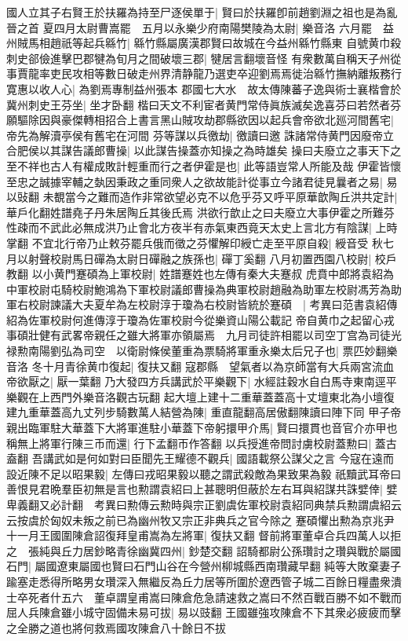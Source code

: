 國人立其子右賢王於扶羅為持至尸逐侯單于|{
	賢曰於扶羅卽前趙劉淵之祖也是為亂晉之首}
夏四月太尉曹嵩罷　五月以永樂少府南陽樊陵為太尉|{
	樂音洛}
六月罷　益州賊馬相趙祇等起兵緜竹|{
	緜竹縣屬廣漢郡賢曰故城在今益州緜竹縣東}
自號黄巾殺刺史郤儉進擊巴郡犍為旬月之間破壞三郡|{
	犍居言翻壞音怪}
有衆數萬自稱天子州從事賈龍率吏民攻相等數日破走州界清静龍乃選吏卒迎劉焉焉徙治緜竹撫納離叛務行寛惠以收人心|{
	為劉焉專制益州張本}
郡國七大水　故太傳陳蕃子逸與術士襄楷會於冀州刺史王芬坐|{
	坐才卧翻}
楷曰天文不利宦者黄門常侍眞族滅矣逸喜芬曰若然者芬願驅除因與豪傑轉相招合上書言黑山賊攻劫郡縣欲因以起兵會帝欲北廵河間舊宅|{
	帝先為解瀆亭侯有舊宅在河間}
芬等謀以兵徼劫|{
	徼讀曰邀}
誅諸常侍黄門因廢帝立合肥侯以其謀告議郎曹操|{
	以此謀告操蓋亦知操之為時雄矣}
操曰夫廢立之事天下之至不祥也古人有權成敗計輕重而行之者伊霍是也|{
	此等語豈常人所能及哉}
伊霍皆懷至忠之誠據宰輔之埶因秉政之重同衆人之欲故能計從事立今諸君徒見曩者之易|{
	易以䜴翻}
未覩當今之難而造作非常欲望必克不以危乎芬又呼平原華歆陶丘洪共定計|{
	華戶化翻姓譜堯子丹朱居陶丘其後氏焉}
洪欲行歆止之曰夫廢立大事伊霍之所難芬性疎而不武此必無成洪乃止會北方夜半有赤氣東西竟天太史上言北方有陰謀|{
	上時掌翻}
不宜北行帝乃止敕芬罷兵俄而徵之芬懼解印綬亡走至平原自殺|{
	綬音受}
秋七月以射聲校尉馬日磾為太尉日磾融之族孫也|{
	磾丁奚翻}
八月初置西園八校尉|{
	校戶教翻}
以小黄門蹇碩為上軍校尉|{
	姓譜蹇姓也左傳有秦大夫蹇叔}
虎賁中郎將袁紹為中軍校尉屯騎校尉鮑鴻為下軍校尉議郎曹操為典軍校尉趙融為助軍左校尉馮芳為助軍右校尉諫議大夫夏牟為左校尉淳于瓊為右校尉皆統於蹇碩　|{
	考異曰范書袁紹傳紹為佐軍校尉何進傳淳于瓊為佐軍校尉今從樂資山陽公載記}
帝自黄巾之起留心戎事碩壯健有武畧帝親任之雖大將軍亦領屬焉　九月司徒許相罷以司空丁宫為司徒光禄勲南陽劉弘為司空　以衛尉條侯董重為票騎將軍重永樂太后兄子也|{
	票匹妙翻樂音洛}
冬十月青徐黄巾復起|{
	復扶又翻}
寇郡縣　望氣者以為京師當有大兵兩宮流血帝欲厭之|{
	厭一葉翻}
乃大發四方兵講武於平樂觀下|{
	水經註穀水自白馬寺東南逕平樂觀在上西門外樂音洛觀古玩翻}
起大壇上建十二重華蓋蓋高十丈壇東北為小壇復建九重華蓋高九丈列步騎數萬人結營為陳|{
	重直龍翻高居傲翻陳讀曰陣下同}
甲子帝親出臨軍駐大華蓋下大將軍進駐小華蓋下帝躬擐甲介馬|{
	賢曰擐貫也音官介亦甲也}
稱無上將軍行陳三币而還|{
	行下孟翻帀作答翻}
以兵授進帝問討虜校尉蓋勲曰|{
	蓋古盍翻}
吾講武如是何如對曰臣聞先王耀德不觀兵|{
	國語載祭公謀父之言}
今寇在遠而設近陳不足以昭果毅|{
	左傳曰戎昭果毅以聽之謂武殺敵為果致果為毅}
祇黷武耳帝曰善恨見君晩羣臣初無是言也勲謂袁紹曰上甚聰明但蔽於左右耳與紹謀共誅嬖倖|{
	嬖卑義翻又必計翻　考異曰勲傳云勲時與宗正劉虞佐軍校尉袁紹同典禁兵勲謂虞紹云云按虞於匈奴未叛之前已為幽州牧又宗正非典兵之官今除之}
蹇碩懼出勲為京兆尹　十一月王國圍陳倉詔復拜皇甫嵩為左將軍|{
	復扶又翻}
督前將軍董卓合兵四萬人以拒之　張純與丘力居鈔略青徐幽冀四州|{
	鈔楚交翻}
詔騎都尉公孫瓚討之瓚與戰於屬國石門|{
	屬國遼東屬國也賢曰石門山谷在今營州柳城縣西南瓚藏早翻}
純等大敗棄妻子踰塞走悉得所略男女瓚深入無繼反為丘力居等所圍於遼西管子城二百餘日糧盡衆潰士卒死者什五六　董卓謂皇甫嵩曰陳倉危急請速救之嵩曰不然百戰百勝不如不戰而屈人兵陳倉雖小城守固備未易可拔|{
	易以豉翻}
王國雖強攻陳倉不下其衆必疲疲而擊之全勝之道也將何救焉國攻陳倉八十餘日不拔

